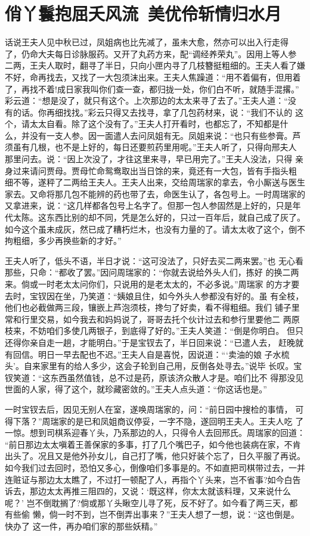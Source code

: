 \chapter{俏丫鬟抱屈夭风流~美优伶斩情归水月}

话说王夫人见中秋已过，凤姐病也比先减了，虽未大愈，然亦可以出入行走得
了，仍命大夫每日诊脉服药。又开了丸药方来，配“调经养荣丸”。因用上等人参
二两，王夫人取时，翻寻了半日，只向小匣内寻了几枝簪挺粗细的。王夫人看了嫌
不好，命再找去，又找了一大包须沫出来。王夫人焦躁道：“用不着偏有，但用着
了，再找不着!成日家我叫你们查一查，都归拢一处，你们白不听，就随手混撂。”
彩云道：“想是没了，就只有这个。上次那边的太太来寻了去了。”王夫人道：“没
有的话。你再细找找。”彩云只得又去找寻，拿了几包药材来，说：“我们不认的
这个，请太太自看。除了这个没有了。”王夫人打开看时，也都忘了，不知都是什
么，并没有一支人参。因一面遣人去问凤姐有无。凤姐来说：“也只有些参膏。芦
须虽有几根，也不是上好的，每日还要煎药里用呢。”王夫人听了，只得向邢夫人
那里问去。说：“因上次没了，才往这里来寻，早已用完了。”王夫人没法，只得
亲身过来请问贾母。贾母忙命鸳鸯取出当日馀的来，竟还有一大包，皆有手指头粗
细不等，遂秤了二两给王夫人。王夫人出来，交给周瑞家的拿去，令小厮送与医生
家去。又命将那几包不能辨的药也带了去，命医生认了，各包号上。一时周瑞家的
又拿进来，说：“这几样都各包号上名字了。但那一包人参固然是上好的，只是年
代太陈。这东西比别的却不同，凭是怎么好的，只过一百年后，就自己成了灰了。
如今这个虽未成灰，然已成了糟朽烂木，也没有力量的了。请太太收了这个，倒不
拘粗细，多少再换些新的才好。”

王夫人听了，低头不语，半日才说：“这可没法了，只好去买二两来罢。”也
无心看那些，只命：“都收了罢。”因问周瑞家的：“你就去说给外头人们，拣好
的换二两来。倘或一时老太太问你们，只说用的是老太太的，不必多说。”周瑞家
的方才要去时，宝钗因在坐，乃笑道：“姨娘且住，如今外头人参都没有好的。虽
有全枝，他们也必截做两三段，镶嵌上芦泡须枝，搀匀了好卖，看不得粗细。我们
铺子里常和行里交易，如今我去和妈妈说了，哥哥去托个伙计过去和参行里要他二
两原枝来，不妨咱们多使几两银子，到底得了好的。”王夫人笑道：“倒是你明白。
但只还得你亲自走一趟，才能明白。”于是宝钗去了，半日回来说：“已遣人去，
赶晚就有回信。明日一早去配也不迟。”王夫人自是喜悦，因说道：“‘卖油的娘
子水梳头’。自来家里有的给人多少，这会子轮到自己用，反倒各处寻去。”说毕
长叹。宝钗笑道：“这东西虽然值钱，总不过是药，原该济众散人才是。咱们比不
得那没见世面的人家，得了这个，就珍藏密敛的。”王夫人点头道：“你这话也是。”

一时宝钗去后，因见无别人在室，遂唤周瑞家的，问：“前日园中搜检的事情，
可得下落？”周瑞家的是已和凤姐商议停妥，一字不隐，遂回明王夫人。王夫人吃
了一惊。想到司棋系迎春丫头，乃系那边的人，只得令人去回邢氏。周瑞家的回道：
“前日那边太太嗔着王善保家的多事，打了几个嘴巴子，如今他也装病在家，不肯
出头了。况且又是他外孙女儿，自己打了嘴，他只好装个忘了，日久平服了再说。
如今我们过去回时，恐怕又多心，倒像咱们多事是的。不如直把司棋带过去，一并
连赃证与那边太太瞧了，不过打一顿配了人，再指个丫头来，岂不省事?如今白告
诉去，那边太太再推三阻四的，又说：‘既这样，你太太就该料理，又来说什么呢？’
岂不倒耽搁了?倘或那丫头瞅空儿寻了死，反不好了。如今看了两三天，都有些偷
懒，倘一时不到，岂不倒弄出事来？”王夫人想了一想，说：“这也倒是。快办了
这一件，再办咱们家的那些妖精。”

